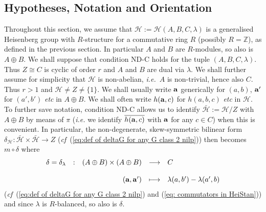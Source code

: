 \documentclass[12pt]{article}
\newcommand{\Aut}{{\rm Aut}}
\newcommand{\ba}{\ensuremath{{\bf a}}}
\newcommand{\bbZ}{\ensuremath{\mathbb{Z}}}
\newcommand{\cD}{\ensuremath{\mathcal{D}}}
\newcommand{\cH}{\ensuremath{\mathcal{H}}}
\newcommand{\displaymapdef}[5]
{
	\begin{array}{rcrcl}
		#1 &:& #2 &\longrightarrow& #3 \\
		& &    &                    \\
		& & #4 &\longmapsto    & #5
	\end{array}
}
\newcommand{\Hom}{{\rm Hom}}
\newcommand{\ie}{{\em i.e.}}
\newcommand{\AdsB}{\ensuremath{A\oplus B}}
\newcommand{\Hei}[4]{\cH({#1},{#2},{#3},{#4})}
\newcommand{\HeiStan}{\Hei{A}{B}{C}{\lambda}}
\newcommand{\SpABd}[1]{\ensuremath{{\rm Sp}_{#1}(\AdsB;\delta)}}
\begin{document}
\subsection{ Hypotheses, Notation and Orientation} 
Throughout this section, we assume that $\cH:=\HeiStan$ is a generalised Heisenberg group with $R$-structure for a commutative ring $R$ (possibly $R=\bbZ$), as defined in the previous section. In particular $A$ and $B$ are $R$-modules, so also is $\AdsB$. We shall suppose that condition ND-C holds for the tuple $(A,B,C,\lambda)$. Thus  $Z\cong C$ is cyclic of order $r$ and $A$ and $B$ are dual via $\lambda$.
We shall further assume for simplicity 
that $\cH$ is non-abelian, \ie\ $A$ is non-trivial, hence also $C$. Thus $r>1$ and $\cH\neq Z\neq \{1\}$. We shall usually write $\ba$ generically for $(a,b)$,  $\ba'$ for $(a',b')$ \textit{etc} in $A\oplus B$. We shall often  write $h(\ba,c)$ for $h(a,b,c)$ \textit{etc} in $\cH$. To further save notation, condition ND-C allows us to identify $\bar{\cH}:=\cH/Z$ with $A\oplus B$ by means of $\pi$ (\textit{i.e.} we identify $\overline{h(\ba,c)}$ with $\ba$ for any $c\in C$) when this is convenient. In particular,  the non-degenerate,  skew-symmetric bilinear form $\delta_\cH :\bar{\cH}\times \bar{\cH}\rightarrow Z$ (\textit{cf}~(\ref{eq:def of deltaG for any G class 2 nilp})) then becomes $m\circ \delta$ where 
\begin{equation}\label{eq:def of delta lambda}
	\displaymapdef{\delta=\delta_\lambda}{(A\oplus B)\times (A\oplus B)}{C}{(\ba,\ba')}{\lambda(a,b')-\lambda(a',b)}
\end{equation}
(\textit{cf}~(\ref{eq:def of deltaG for any G class 2 nilp})  and (\ref{eq: commutators in HeiStan})) and since $\lambda$ is $R$-balanced, so also is  $\delta$.
\end{document}
